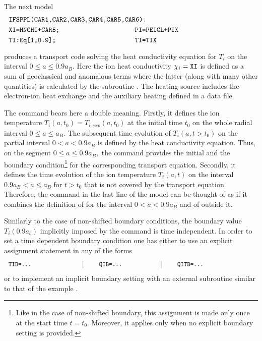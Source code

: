 The next model
\begin{equation}\label{model3}
\begin{tabular}{p{6cm}p{6cm}}
\multicolumn{2}{l}{\tt IFSPPL(CAR1,CAR2,CAR3,CAR4,CAR5,CAR6):}
\smallskip\\
{\tt XI=HNCHI+CAR5;} & {\tt PI=PEICL+PIX}
\smallskip\\
{\tt TI:Eq[1,0.9];}	& {\tt TI=TIX}
\smallskip\\
\end{tabular}
\end{equation}
produces a transport code solving the heat conductivity equation for
$T_i$ on the interval $0\leq a\leq 0.9a_B.$ 
Here the ion heat conductivity $\chi_i=\tt XI$ is defined as a sum of
neoclassical and anomalous terms where the latter (along with many other
quantities) is calculated by the subroutine . 
The heating source  includes the electron-ion heat exchange
 and the auxiliary heating  defined in a data file.

The command  bears here a double meaning.
Firstly, it defines the ion temperature $T_i(a,t_0)=T_{i,exp}(a,t_0)$ at
the initial time $t_0$ on the whole radial interval $0\leq a\leq a_B.$ 
The subsequent time evolution of $T_i(a,t>t_0)$ on the partial interval
$0<a<0.9a_B$ is defined by the heat conductivity equation. 
Thus, on the segment $0\leq a\leq 0.9a_B,$ the command 
provides the initial and the boundary condition\footnote
{Like in the case of non-shifted boundary, this assignment is made
only once at the start time $t=t_0.$ 
Moreover, it applies only when no explicit boundary setting is provided.}
for the corresponding transport equation. 
Secondly, it defines the time evolution of the ion temperature 
$T_i(a,t)$ on the interval $0.9a_B<a\leq a_B$ for $t>t_0$ that is not
covered by the transport equation.
Therefore, the command  in the last line of the model
 can be thought of as if it combines the definition of
 for the interval $0<a<0.9a_B$ and of
 outside it. 

Similarly to the case of non-shifted boundary conditions, the boundary
value $T_i(0.9a_b)$ implicitly imposed by the command  is
time independent. 
In order to set a time dependent boundary condition one has either to
use an explicit assignment statement in any of the forms
$$
\begin{tabular}{p{4cm}|p{4cm}|p{5cm}}
\tt TIB=... &\qq\tt QIB=... &\qq\tt QITB=\dots \\
\end{tabular}
$$
or to implement an implicit boundary setting with an external subroutine
similar to that of the example .

